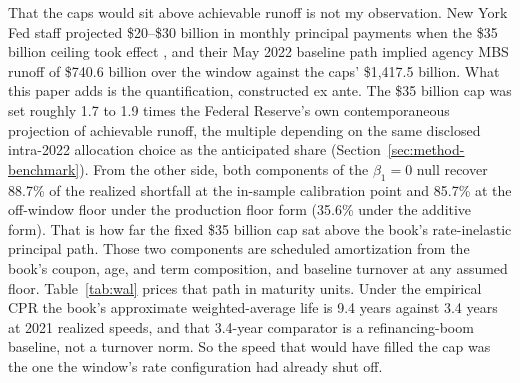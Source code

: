 \documentclass[12pt]{article}
\begin{document}
That the caps would sit above achievable runoff is not my observation. New York Fed staff projected \$20--\$30 billion in monthly principal payments when the \$35 billion ceiling took effect \citep{nyfed2022}, and their May 2022 baseline path implied agency MBS runoff of \$740.6 billion over the window against the caps' \$1{,}417.5 billion. What this paper adds is the quantification, constructed ex ante. The \$35 billion cap was set roughly 1.7 to 1.9 times the Federal Reserve's own contemporaneous projection of achievable runoff, the multiple depending on the same disclosed intra-2022 allocation choice as the anticipated share (Section~\ref{sec:method-benchmark}). From the other side, both components of the $\beta_1 = 0$ null recover 88.7\% of the realized shortfall at the in-sample calibration point and 85.7\% at the off-window floor under the production floor form (35.6\% under the additive form). That is how far the fixed \$35 billion cap sat above the book's rate-inelastic principal path. Those two components are scheduled amortization from the book's coupon, age, and term composition, and baseline turnover at any assumed floor. Table~\ref{tab:wal} prices that path in maturity units. Under the empirical CPR the book's approximate weighted-average life is 9.4 years against 3.4 years at 2021 realized speeds, and that 3.4-year comparator is a refinancing-boom baseline, not a turnover norm. So the speed that would have filled the cap was the one the window's rate configuration had already shut off.
\end{document}
